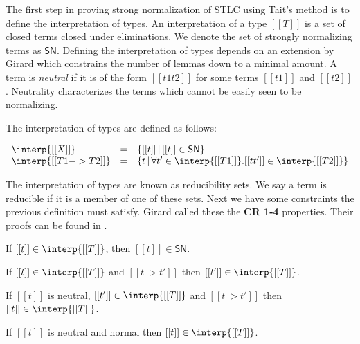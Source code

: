 The first step in proving strong normalization of STLC using Tait's
method is to define the interpretation of types.  An interpretation of
a type $[[T]]$ is a set of closed terms closed under eliminations.  We
denote the set of strongly normalizing terms as $\mathsf{SN}$.
Defining the interpretation of types depends on an extension by Girard
which constrains the number of lemmas down to a minimal amount.  A
term is \emph{neutral} if it is of the form $[[t1 t2]]$ for some terms
$[[t1]]$ and $[[t2]]$.  Neutrality characterizes the terms which
cannot be easily seen to be normalizing.
\begin{definition}
  \label{def:stlc_interpretation_taits}
  The interpretation of types are defined as follows:
  \begin{center}
    \begin{math}
      \begin{array}{lll}
        \interp{[[X]]} & = & \{[[t]]\,|\, [[t]] \in \mathsf{SN} \}\\
        \interp{[[T1 -> T2]]} & = & \{ t\,|\,\forall t' \in \interp{[[T1]]}.
               [[t t']] \in \interp{[[T2]]} \}      
      \end{array}
    \end{math}
  \end{center}
\end{definition}
\noindent
The interpretation of types are known as reducibility sets.  We say a
term is reducible if it is a member of one of these sets.  Next we
have some constraints the previous definition must satisfy.  Girard
called these the \textbf{CR 1-4} properties.  Their proofs can be
found in \cite{Girard:1989}.
\begin{lemma}
  \label{lemma:stlc_sn_cr1}
  If $[[t]] \in \interp{[[T]]}$, then $[[t]] \in \mathsf{SN}$.
\end{lemma}

\begin{lemma}
  \label{lemma:stlc_sn_cr2}
  If $[[t]] \in \interp{[[T]]}$ and $[[t ~> t']]$ then $[[t']] \in \interp{[[T]]}$.
\end{lemma}

\begin{lemma}
  \label{lemma:stlc_sn_cr3}
  If $[[t]]$ is neutral, $[[t']] \in \interp{[[T]]}$ and $[[t ~> t']]$ then 
  $[[t]] \in \interp{[[T]]}$.
\end{lemma}

\begin{lemma}
  \label{lemma:stlc_sn_cr4}
  If $[[t]]$ is neutral and normal then $[[t]] \in \interp{[[T]]}$.
\end{lemma}

